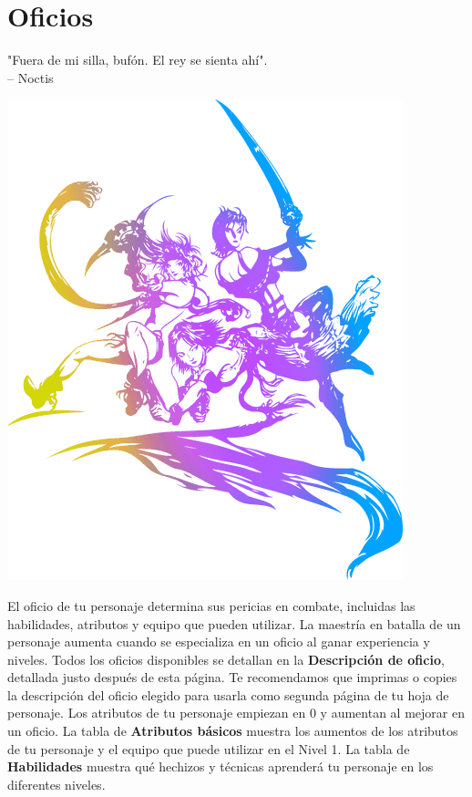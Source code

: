 \section*{\hypertarget{job}{Oficios}}
%
"Fuera de mi silla, bufón. El rey se sienta ahí". \\
\indent -- Noctis 
%
\begin{center}
\includegraphics[width=\columnwidth]{./art/images/ff10-2.png} 
\end{center}
%
El oficio de tu personaje determina sus pericias en combate, incluidas las habilidades, atributos y equipo que pueden utilizar. La maestría en batalla de un personaje aumenta cuando se especializa en un oficio al ganar experiencia y niveles. Todos los oficios disponibles se detallan en la \textbf{Descripción de oficio}, detallada justo después de esta página. Te recomendamos que imprimas o copies la descripción del oficio elegido para usarla como segunda página de tu hoja de personaje. Los atributos de tu personaje empiezan en 0 y aumentan al mejorar en un oficio. La tabla de \textbf{Atributos básicos }muestra los aumentos de los atributos de tu personaje y el equipo que puede utilizar en el Nivel 1. La tabla de \textbf{Habilidades} muestra qué hechizos y técnicas aprenderá tu personaje en los diferentes niveles.

